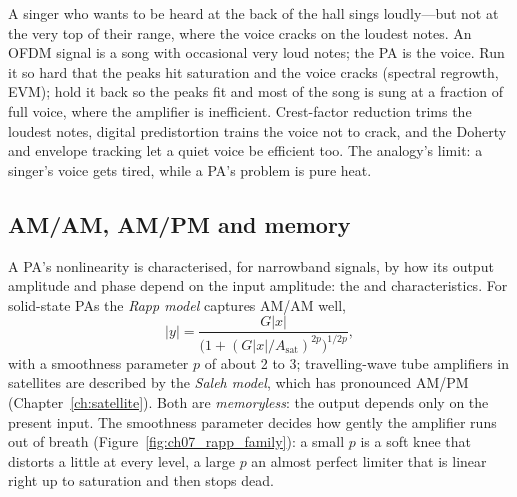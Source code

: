 \begin{analogy}
A singer who wants to be heard at the back of the hall sings loudly---but not at the very top of their
range, where the voice cracks on the loudest notes. An OFDM signal is a song with occasional very loud
notes; the PA is the voice. Run it so hard that the peaks hit saturation and the voice cracks (spectral
regrowth, EVM); hold it back so the peaks fit and most of the song is sung at a fraction of full voice,
where the amplifier is inefficient. Crest-factor reduction trims the loudest notes, digital
predistortion trains the voice not to crack, and the Doherty and envelope tracking let a quiet voice be
efficient too. The analogy's limit: a singer's voice gets tired, while a PA's problem is pure heat.
\end{analogy}


\subsection{AM/AM, AM/PM and memory}

A PA's nonlinearity is characterised, for narrowband signals, by how its output amplitude and phase
depend on the input amplitude: the  and  characteristics. For solid-state PAs the
\emph{Rapp model} captures AM/AM well,
\begin{equation}
|y|=\frac{G|x|}{\big(1+(G|x|/A_{\text{sat}})^{2p}\big)^{1/2p}},
\end{equation}
with a smoothness parameter $p$ of about 2 to 3; travelling-wave tube amplifiers in satellites are
described by the \emph{Saleh model}, which has pronounced AM/PM (Chapter~\ref{ch:satellite}). Both are
\emph{memoryless}: the output depends only on the present input. The smoothness parameter
decides how gently the amplifier runs out of breath (Figure~\ref{fig:ch07_rapp_family}): a small $p$
is a soft knee that distorts a little at every level, a large $p$ an almost perfect limiter that is
linear right up to saturation and then stops dead.


